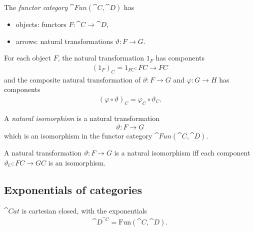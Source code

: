 \documentclass{article}
\begin{document}
\begin{definition}[Awodey p. 158]
    The \emph{functor category} $\cat{Fun}(\cat C, \cat D)$ has
    \begin{itemize}
        \item objects: functors $F:\cat C \to \cat D$,
        \item arrows: natural transformations $\vartheta:F\to G$.
    \end{itemize}
    For each object $F$, the natural transformation $1_F$ has components
    \begin{align*}
        (1_F)_C = 1_{FC}:FC\to FC
    \end{align*}
    and the composite natural transformation of $\vartheta:F\to G$ and
    $\varphi:G\to H$ has components
    \begin{align*}
        (\varphi\circ\vartheta)_C=\varphi_C\circ\vartheta_C.
    \end{align*}
\end{definition}

\begin{definition}[Awodey p. 158]
    A \emph{natural isomorphism} is a natural transformation
    \begin{align*}
        \vartheta: F\to G
    \end{align*}
    which is an isomorphism in the functor category $\cat{Fun}(\cat C, \cat D)$.
\end{definition}

\begin{lemma}[Awodey p. 159]
    A natural transformation $\vartheta:F\to G$ is a natural isomorphism
    iff each component $\vartheta_C:FC\to GC$ is an isomorphism.
\end{lemma}

\subsection{Exponentials of categories}

\begin{proposition}[Awodey p. 161]
    $\cat{Cat}$ is cartesian closed, with the exponentials
    \begin{align*}
        \cat D^{\cat C} = \text{Fun}(\cat C, \cat D).
    \end{align*}
\end{proposition}
\end{document}
